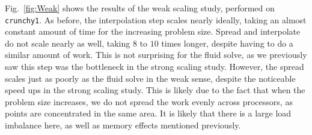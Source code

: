 \documentclass[]{article}
\begin{document}
Fig.\ \ref{fig:Weak} shows the results of the weak scaling study, performed on \texttt{crunchy1}. As before, the interpolation step scales nearly ideally, taking an almost constant amount of time for the increasing problem size. Spread and interpolate do not scale nearly as well, taking $8$ to $10$ times longer, despite having to do a similar amount of work. This is not surprising for the fluid solve, as we previously saw this step was the bottleneck in the strong scaling study. However, the spread scales just as poorly as the fluid solve in the weak sense, despite the noticeable speed ups in the strong scaling study. This is likely due to the fact that when the problem size increases, we do not spread the work evenly across processors, as points are concentrated in the same area. It is likely that there is a large load imbalance here, as well as memory effects mentioned previously. 







\newpage



\end{document}
